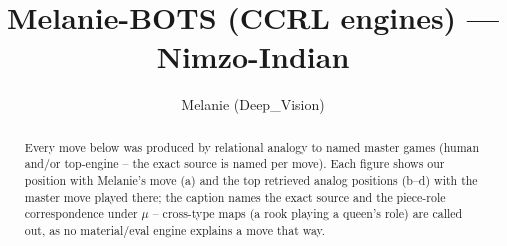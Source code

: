 \documentclass[11pt]{article}
\title{Melanie-BOTS (CCRL engines) — Nimzo-Indian}
\author{Melanie (Deep\_Vision)}
\date{}
\begin{document}
\maketitle

\begin{abstract}Every move below was produced by relational analogy to named master games (human and/or top-engine -- the exact source is named per move). Each figure shows our position with Melanie's move (a) and the top retrieved analog positions (b--d) with the master move played there; the caption names the exact source and the piece-role correspondence under $\mu$ -- cross-type maps (a rook playing a queen's role) are called out, as no material/eval engine explains a move that way.\end{abstract}

\begin{figure}[p]\centering
\begin{subfigure}{0.46\textwidth}\centering
\resizebox{\linewidth}{!}{%
\newchessgame
\chessboard[
  setfen={rnbq1rk1/pp3ppp/4pn2/2pP4/1b1P4/2NBPN2/PP3PPP/R1BQK2R b KQ - 0 7},
  showmover=false,
  pgfstyle=straightmove, color=movearrow, markmove={c5-d4}
]}
\caption{}
\end{subfigure}\hfill
\begin{subfigure}{0.46\textwidth}\centering
\resizebox{\linewidth}{!}{%
\newchessgame
\chessboard[
  setfen={rnbq1rk1/pp3ppp/4pn2/2pP4/1b1P4/2NBP3/PP2NPPP/R1BQK2R b KQ - 0 7},
  showmover=false,
  pgfstyle=straightmove, color=movearrow, markmove={c5-d4}
]}
\caption{}
\end{subfigure}
\\[4pt]
\begin{subfigure}{0.46\textwidth}\centering
\resizebox{\linewidth}{!}{%
\newchessgame
\chessboard[
  setfen={rnbq1rk1/pp3ppp/4pn2/2pP4/1b1P4/2NBP3/PP2NPPP/R1BQK2R b KQ - 0 7},
  showmover=false,
  pgfstyle=straightmove, color=movearrow, markmove={c5-d4}
]}
\caption{}
\end{subfigure}\hfill
\begin{subfigure}{0.46\textwidth}\centering
\resizebox{\linewidth}{!}{%
\newchessgame
\chessboard[
  setfen={rnbq1rk1/pp3ppp/4pn2/2pP4/1b1P4/2NBP3/PP2NPPP/R1BQK2R b KQ - 0 7},
  showmover=false,
  pgfstyle=straightmove, color=movearrow, markmove={c5-d4}
]}
\caption{}
\end{subfigure}

\end{figure}
\end{document}
